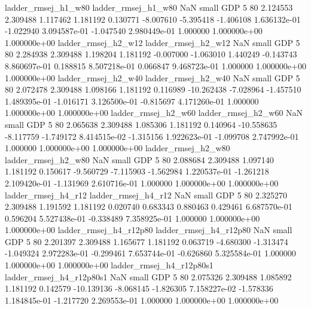      ladder_rmsej_h1_w80      ladder_rmsej_h1_w80                   NaN      small      GDP                 5 80 2.124553       2.309488 1.117462       1.181192    0.130771     -8.007610     -5.395418    -1.406108   1.636132e-01 -1.022940 3.094587e-01    -1.047540   2.980449e-01            1.000000    1.000000e+00        1.000000e+00
     ladder_rmsej_h2_w12      ladder_rmsej_h2_w12                   NaN      small      GDP                 5 80 2.284938       2.309488 1.198204       1.181192   -0.007000     -1.063010      1.440249    -0.143743   8.860697e-01  0.188815 8.507218e-01     0.066847   9.468723e-01            1.000000    1.000000e+00        1.000000e+00
     ladder_rmsej_h2_w40      ladder_rmsej_h2_w40                   NaN      small      GDP                 5 80 2.072478       2.309488 1.098166       1.181192    0.116989    -10.262438     -7.028964    -1.457510   1.489395e-01 -1.016171 3.126500e-01    -0.815697   4.171260e-01            1.000000    1.000000e+00        1.000000e+00
     ladder_rmsej_h2_w60      ladder_rmsej_h2_w60                   NaN      small      GDP                 5 80 2.065638       2.309488 1.085306       1.181192    0.140964    -10.558635     -8.117759    -1.749172   8.414515e-02 -1.315156 1.922623e-01    -1.099708   2.747992e-01            1.000000    1.000000e+00        1.000000e+00
     ladder_rmsej_h2_w80      ladder_rmsej_h2_w80                   NaN      small      GDP                 5 80 2.088684       2.309488 1.097140       1.181192    0.150617     -9.560729     -7.115903    -1.562984   1.220537e-01 -1.261218 2.109420e-01    -1.131969   2.610716e-01            1.000000    1.000000e+00        1.000000e+00
     ladder_rmsej_h4_r12      ladder_rmsej_h4_r12                   NaN      small      GDP                 5 80 2.325270       2.309488 1.191592       1.181192    0.020740      0.683343      0.880463     0.429461   6.687570e-01  0.596204 5.527438e-01    -0.338489   7.358925e-01            1.000000    1.000000e+00        1.000000e+00
  ladder_rmsej_h4_r12p80   ladder_rmsej_h4_r12p80                   NaN      small      GDP                 5 80 2.201397       2.309488 1.165677       1.181192    0.063719     -4.680300     -1.313474    -1.049324   2.972283e-01 -0.299461 7.653744e-01    -0.626860   5.325584e-01            1.000000    1.000000e+00        1.000000e+00
ladder_rmsej_h4_r12p80s1 ladder_rmsej_h4_r12p80s1                   NaN      small      GDP                 5 80 2.075326       2.309488 1.085892       1.181192    0.142579    -10.139136     -8.068145    -1.826305   7.158227e-02 -1.578336 1.184845e-01    -1.217720   2.269553e-01            1.000000    1.000000e+00        1.000000e+00
